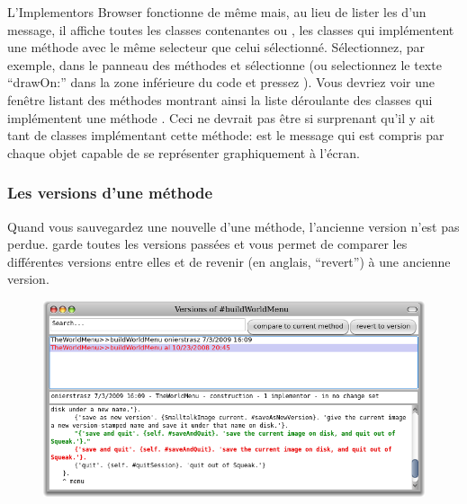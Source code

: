 \documentclass[a4paper,10pt,twoside]{book}
\begin{document}
L'Implementors Browser fonctionne de même mais, au lieu de
lister les \senders d'un message, il affiche toutes les classes
contenantes ou \implementors, \ie les classes qui implémentent une
méthode avec le même selecteur
que celui sélectionné.
Sélectionnez, par exemple,  dans le panneau des méthodes
et sélectionne  (ou selectionnez le
texte ``drawOn:'' dans la zone inférieure du code et pressez 
).
Vous devriez voir une fenêtre listant des méthodes montrant ainsi la
liste déroulante des \arevoir{\drawOnImplNumber} %
classes qui implémentent une méthode .
Ceci ne devrait pas être si surprenant qu'il y ait tant de classes
implémentant cette méthode:  est le message qui est
compris par chaque objet capable de se représenter graphiquement à
l'écran.

\subsubsection{Les versions d'une méthode}

Quand vous sauvegardez une nouvelle  d'une méthode,
l'ancienne version n'est pas perdue. \pharo garde toutes les versions passées et vous permet 
de comparer les différentes versions entre elles et de revenir (en anglais, ``revert'') à une ancienne version.
\begin{figure}[btp]
   \centering
	   {\includegraphics[width=\textwidth]{Versions} }
   \caption{}
\end{figure} %
\end{document}

